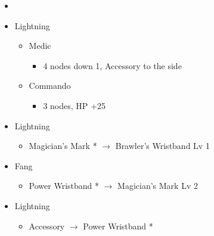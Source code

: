 \begin{menu}
\begin{multicols}{2}
\begin{itemize}
    \paradigm
    \begin{itemize}
        \item {}%
{\paradigmline{\com}{\com}{\rav}}%
{\paradigmline{\rav}{\com}{\rav}}%
{\paradigmline{(\com)}{(\com)}{\rav}}%
{\paradigmline{(\com)}{(\com)}{(\med)}}%
{\paradigmline[5]{\textit{(\com)}}{\textit{(\com)}}{\textit{\syn}}}%
{\paradigmline{(\com)}{\com}{(\med)}}
    \end{itemize}
    \crystarium
    \begin{itemize}
        \item Lightning
        \begin{itemize}
            \item Medic
            \begin{itemize}
                \item 4 nodes down 1, Accessory to the side
            \end{itemize}
            \item Commando
            \begin{itemize}
                \item 3 nodes, HP +25
            \end{itemize}
        \end{itemize}
    \end{itemize}
    \columnbreak
    \equip
    \begin{itemize}
        \item Lightning
        \begin{itemize}
                \item Magician's Mark * $\rightarrow$ Brawler's Wristband Lv 1
        \end{itemize}
        \item Fang
        \begin{itemize}
                \item Power Wristband * $\rightarrow$ Magician's Mark Lv 2
        \end{itemize}
        \item Lightning
        \begin{itemize}
                \item Accessory $\rightarrow$ Power Wristband *
        \end{itemize}
    \end{itemize}
\end{itemize}
\end{multicols}
\end{menu}

